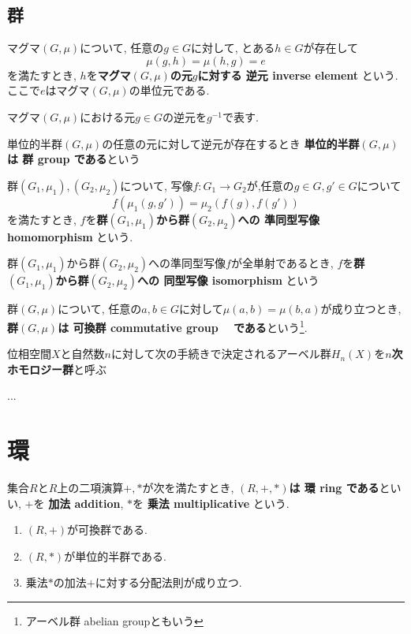 \subsection{群}
\begin{Def}
マグマ$(G,\mu)$について, 任意の$g\in G$に対して, とある$h\in G$が存在して \[\mu(g,h)=\mu(h,g)=e\]を満たすとき, $h$を{\bf マグマ$(G,\mu)$の元$g$に対する
逆元 inverse element
}という.
ここで$e$はマグマ$(G,\mu)$の単位元である.
\end{Def}
\begin{Notation}
マグマ$(G,\mu)$における元$g\in G$の逆元を$g^{-1}$で表す.
\end{Notation}
\begin{Def}
単位的半群$(G,\mu)$の任意の元に対して逆元が存在するとき
{\bf 単位的半群$(G,\mu)$は
群 group
である}という
\end{Def}
\begin{Def}
群$(G_1,\mu_1),(G_2,\mu_2)$について, 写像$f:G_1\rightarrow G_2$が,任意の$g\in G, g'\in G$について \[f(\mu_1(g,g')) = \mu_2(f(g),f(g'))\] を満たすとき, $f$を{\bf 群$(G_1,\mu_1)$から群$(G_2,\mu_2)$への
準同型写像 homomorphism
}という.
\end{Def}
\begin{Def}
群$(G_1,\mu_1)$から群$(G_2,\mu_2)$への準同型写像$f$が全単射であるとき,
$f$を{\bf 群$(G_1,\mu_1)$から群$(G_2,\mu_2)$への
同型写像 isomorphism
}という
\end{Def}
\begin{Def}
群$(G,\mu)$について,
任意の$a,b\in G$に対して$\mu(a,b)=\mu(b,a)$が成り立つとき,
{\bf 群$(G,\mu)$は
可換群 commutative group　 
である}という\footnote{アーベル群 abelian groupともいう}.
\end{Def}

\begin{Def}
位相空間$X$と自然数$n$に対して次の手続きで決定されるアーベル群$H_n(X)$を{\bf$n$次 ホモロジー群}と呼ぶ

...

\end{Def}


\section{環}
\begin{Def}
集合$R$と$R$上の二項演算$+,*$が次を満たすとき, {\bf $(R,+,*)$は
環 ring 
である}といい, 
$+$を
{\bf 加法 addition}, $*$を
{\bf 乗法 multiplicative}
という. 
\begin{enumerate}
\item $(R,+)$が可換群である.
\item $(R,*)$が単位的半群である.
\item 乗法$*$の加法$+$に対する分配法則が成り立つ.
\end{enumerate}
\end{Def}

